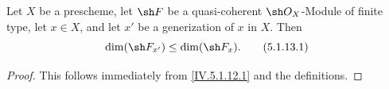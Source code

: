 \begin{proposition}[5.1.13]
\label{IV.5.1.13}
Let $X$ be a prescheme, let $\sh F$ be a quasi-coherent
$\sh O_X$-Module of finite type, let $x\in X$, and let $x'$ be a
generization of $x$ in $X$. Then
\begin{equation}
\dim(\sh F_{x'})\leq\dim(\sh F_x).
\tag{5.1.13.1}\label{IV.5.1.13.1}
\end{equation}
\end{proposition}

\begin{proof}
This follows immediately from \eqref{IV.5.1.12.1} and the
definitions.
\end{proof}
